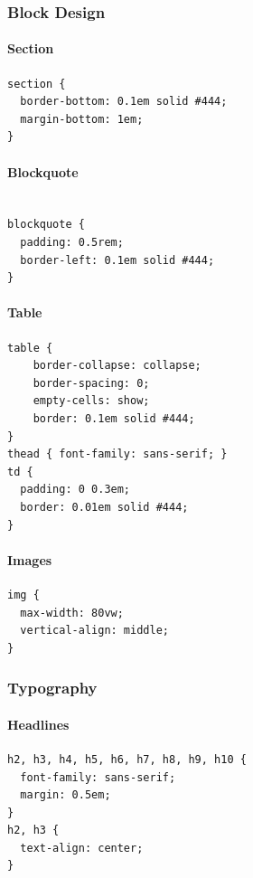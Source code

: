 \documentclass[11pt]{article}
\begin{document}
\subsubsection*{Block Design}
\label{sec:org4f267c0}
\paragraph*{Section}
\label{sec:org6c33864}
\begin{verbatim}
section {
  border-bottom: 0.1em solid #444;
  margin-bottom: 1em;
}
\end{verbatim}
\paragraph*{Blockquote}
\label{sec:orgc913077}
\begin{verbatim}

blockquote {
  padding: 0.5rem;
  border-left: 0.1em solid #444;
}
\end{verbatim}

\paragraph*{Table}
\label{sec:org9d89009}
\begin{verbatim}
table {
    border-collapse: collapse;
    border-spacing: 0;
    empty-cells: show;
    border: 0.1em solid #444;
}
thead { font-family: sans-serif; }
td {
  padding: 0 0.3em;
  border: 0.01em solid #444;
}
\end{verbatim}
\paragraph*{Images}
\label{sec:orge091b7c}
\begin{verbatim}
img {
  max-width: 80vw;
  vertical-align: middle;
}
\end{verbatim}
\subsubsection*{Typography}
\label{sec:orgfca00e5}
\paragraph*{Headlines}
\label{sec:orgf764e61}
\begin{verbatim}
h2, h3, h4, h5, h6, h7, h8, h9, h10 {
  font-family: sans-serif;
  margin: 0.5em;
}
h2, h3 {
  text-align: center;
}
\end{verbatim}
\end{document}
